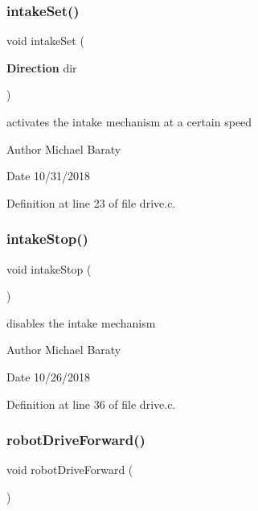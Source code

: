 \subsubsection{intake\+Set()}
{\footnotesize\ttfamily void intake\+Set (\begin{DoxyParamCaption}\item[{\textbf{ Direction}}]{dir }\end{DoxyParamCaption})}



activates the intake mechanism at a certain speed 

\begin{DoxyAuthor}{Author}
Michael Baraty 
\end{DoxyAuthor}
\begin{DoxyDate}{Date}
10/31/2018 
\end{DoxyDate}


Definition at line 23 of file drive.\+c.

\mbox{\label{drive_8c_a62c5f4e08161e15214b78686e675aabb}} 
\subsubsection{intake\+Stop()}
{\footnotesize\ttfamily void intake\+Stop (\begin{DoxyParamCaption}{ }\end{DoxyParamCaption})}



disables the intake mechanism 

\begin{DoxyAuthor}{Author}
Michael Baraty 
\end{DoxyAuthor}
\begin{DoxyDate}{Date}
10/26/2018 
\end{DoxyDate}


Definition at line 36 of file drive.\+c.

\mbox{\label{drive_8c_af9b0c744a3f92085b9e6d2c9a3341492}} 
\subsubsection{robot\+Drive\+Forward()}
{\footnotesize\ttfamily void robot\+Drive\+Forward (\begin{DoxyParamCaption}{ }\end{DoxyParamCaption})}



